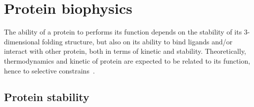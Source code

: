 \section{Protein biophysics}

The ability of a protein to performs its function depends on the stability of its 3-dimensional folding structure, but also on its ability to bind ligands and/or interact with other protein, both in terms of kinetic and stability.
Theoretically, thermodynamics and kinetic of protein are expected to be related to its function, hence to selective constrains~\citep{Bastolla2017}.

\subsection{Protein stability}

